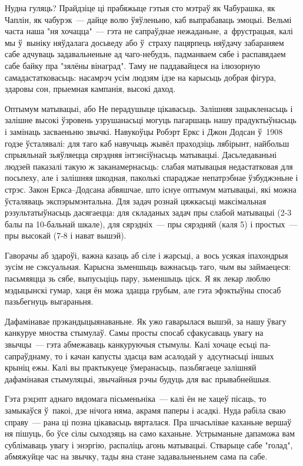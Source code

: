 Нудна гуляць? Прайдзіце ці прабяжыце гэтыя сто мэтраў як Чабурашка, як Чаплін, як чабурэк~--- дайце волю ўяўленьню, каб выпрабаваць эмоцыі. Вельмі часта наша "ня хочацца"~--- гэта не сапраўднае нежаданьне, а~фрустрацыя, калі мы ў~выніку няўдалага досьведу або ў~страху пацярпець няўдачу забараняем сабе адчуваць задавальненьне ад чаго-небудзь, падманваем сябе і распавядаем сабе байку пра "зялёны вінаград". Таму не паддавайцеся на ілюзорную самадастатковасьць: насамрэч усім людзям ідзе на карысьць добрая фігура, здаровы сон, прыемная кампанія, высокі даход.

Оптымум матывацыі, або Не перадушыце цікавасьць. Залішняя зацыкленасьць і залішне высокі ўзровень узрушанасьці могуць пагаршаць нашу прадуктыўнасьць і замінаць засваеньню звычкі. Навукоўцы Робэрт Еркс і Джон Додсан ў~1908 годзе ўсталявалі: для таго каб навучыць жывёл праходзіць лябірынт, найбольш спрыяльнай зьяўляецца сярэдняя інтэнсіўнасьць матывацыі. Дасьледаваньні людзей паказалі такую ж заканамернасьць: слабая матывацыя недастатковая для посьпеху, але і залішняя шкодная, паколькі спараджае непатрэбнае ўзбуджэньне і стрэс. Закон Еркса--Додсана абвяшчае, што існуе оптымум матывацыі, які можна ўсталяваць экспэрымэнтальна. Для задач рознай цяжкасьці максімальная рэзультатыўнасьць дасягаецца: для складаных задач пры слабой матывацыі (2-3 балы па 10-бальнай шкале), для сярэдніх~--- пры сярэдняй (каля 5) і простых~--- пры высокай (7-8 і нават вышэй).

Гаворачы аб здароўі, важна казаць аб сіле і жарсьці, а~вось усякая іпахондрыя зусім не сэксуальная. Карысна зьменшыць важнасьць таго, чым вы займаецеся: пасьмяяцца зь сябе, выпусьціць пару, зьменшыць ціск. Я як лекар люблю мэдыцынскі гумар, хаця ён можа здацца грубым, але гэта эфэктыўны спосаб пазьбегнуць выгараньня.

Дафамінавае прэкандыцыянаваньне. Як ужо гаварылася вышэй, за нашу ўвагу канкуруе мноства стымулаў. Самы просты спосаб сфакусаваць увагу на звычцы~--- гэта абмежаваць канкуруючыя стымулы. Калі хочаце есьці па-сапраўднаму, то і качан капусты здасца вам асалодай у~адсутнасьці іншых крыніц ежы. Калі вы практыкуеце ўмеранасьць, пазьбягаеце залішняй дафамінавая стымуляцыі, звычайныя рэчы будуць для вас прывабнейшыя.

Гэта рэцэпт аднаго вядомага пісьменьніка~--- калі ён не хацеў пісаць, то замыкаўся ў~пакоі, дзе нічога няма, акрамя паперы і асадкі. Нуда рабіла сваю справу~--- рана ці позна цікавасьць вярталася. Пра шчасьлівае каханьне вершаў ня пішуць, бо ўсе сілы сыходзяць на само каханьне. Устрыманьне дапаможа вам сублімаваць увагу і энэргію, распаліць агонь матывацыі. Стварыце сабе "голад", абмяжуйце час на звычку, тады яна стане задавальненьнем сама па сабе.

